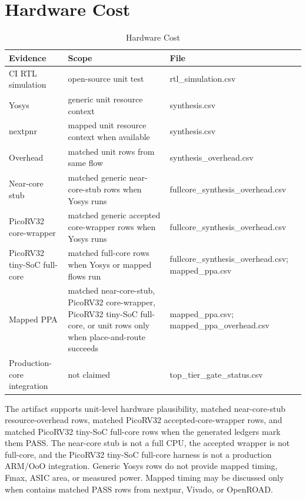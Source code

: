 \documentclass[10pt]{article}
\begin{document}
\section{Hardware Cost}
\begin{table}[H]
\centering
\caption{Hardware Cost}
\begin{tabularx}{\linewidth}{YYY}
\hline
Evidence & Scope & File \\
\hline
CI RTL simulation & open-source unit test & rtl\_simulation.csv \\
Yosys & generic unit resource context & synthesis.csv \\
nextpnr & mapped unit resource context when available & synthesis.csv \\
Overhead & matched unit rows from same flow & synthesis\_overhead.csv \\
Near-core stub & matched generic near-core-stub rows when Yosys runs & fullcore\_synthesis\_overhead.csv \\
PicoRV32 core-wrapper & matched generic accepted core-wrapper rows when Yosys runs & fullcore\_synthesis\_overhead.csv \\
PicoRV32 tiny-SoC full-core & matched full-core rows when Yosys or mapped flows run & fullcore\_synthesis\_overhead.csv; mapped\_ppa.csv \\
Mapped PPA & matched near-core-stub, PicoRV32 core-wrapper, PicoRV32 tiny-SoC full-core, or unit rows only when place-and-route succeeds & mapped\_ppa.csv; mapped\_ppa\_overhead.csv \\
Production-core integration & not claimed & top\_tier\_gate\_status.csv \\
\hline
\end{tabularx}
\end{table}

The artifact supports unit-level hardware plausibility, matched near-core-stub resource-overhead rows, matched PicoRV32 accepted-core-wrapper rows, and matched PicoRV32 tiny-SoC full-core rows when the generated ledgers mark them PASS. The near-core stub is not a full CPU, the accepted wrapper is not full-core, and the PicoRV32 tiny-SoC full-core harness is not a production ARM/OoO integration. Generic Yosys rows do not provide mapped timing, Fmax, ASIC area, or measured power. Mapped timing may be discussed only when  contains matched PASS rows from nextpnr, Vivado, or OpenROAD.
\end{document}
